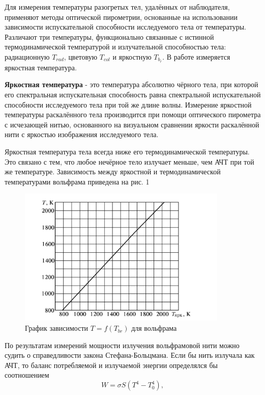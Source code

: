 \documentclass[15pt,a5paper,reqno]{article}
\begin{document}
Для измерения температуры разогретых тел, удалённых от наблюдателя, применяют методы оптической пирометрии, основанные на использовании зависимости испускательной способности исследуемого тела от температуры. Различают три температуры, функционально связанные с истинной термодинамической температурой и излучательной способностью тела: радиационную $T_{rad}$, цветовую $T_{col}$ и яркостную $T_{b_r}$.
В работе измеряется яркостная температура.

\textbf{Яркостная температура} - это температура абсолютно чёрного тела, при которой его спектральная испускательная способность равна спектральной испускательной способности исследуемого тела при той же длине волны.
 Измерение яркостной температуры раскалённого тела производится при помощи оптического пирометра с исчезающей нитью, основанного на визуальном сравнении яркости раскалённой нити с яркостью изображения исследуемого тела. \par
Яркостная температура тела всегда ниже его термодинамической температуры. Это связано с тем, что любое нечёрное тело излучает меньше, чем АЧТ при той же температуре. Зависимость между яркостной и термодинамической температурами вольфрама приведена на рис. 1

\begin{figure}[h]
    \centering
    \includegraphics[width=10cm]{pics/lab_5_8_1_theor.png}
    \caption{График зависимости $T = f(T_{br})$ для вольфрама}
    \label{fig:vac}
\end{figure}

По результатам измерений мощности излучения вольфрамовой нити можно судить о справедливости закона Стефана-Больцмана. Если бы нить излучала как АЧТ, то баланс потребляемой и излучаемой энергии определялся бы соотношением 
\begin{equation}
    W = \sigma S (T^4 - T_0^4),
\end{equation}
\end{document}
